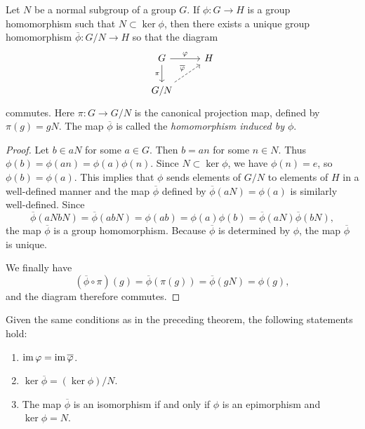 \begin{theorem}
    \label{thm:induced-homomorphism}
    Let \(N\) be a normal subgroup of a group \(G\). If \(\phi: G \to H\) is a
    group homomorphism such that \(N \subset \ker \phi\), then there exists a
    unique group homomorphism \(\overline{\phi}: G/N \to H\) so that the diagram
    \[
        \begin{tikzcd}
            G \arrow{r}{\phi} \arrow[swap]{d}{\pi} & H \\
            G/N \arrow[dashed]{ur}{\overline{\phi}}
        \end{tikzcd}
    \]
    commutes. Here \(\pi: G \to G/N\) is the canonical projection map, defined
    by \(\pi(g) = gN\). The map \(\overline{\phi}\) is called the
    \emph{homomorphism induced by \(\phi\)}.
\end{theorem}

\begin{proof}
    Let \(b \in aN\) for some \(a \in G\). Then \(b = an\) for some \(n \in N\).
    Thus \(\phi(b) = \phi(an) = \phi(a)\phi(n)\). Since \(N \subset \ker \phi\),
    we have \(\phi(n) = e\), so \(\phi(b) = \phi(a)\). This implies that
    \(\phi\) sends elements of \(G/N\) to elements of \(H\) in a well-defined
    manner and the map \(\overline{\phi}\) defined by \(\overline{\phi}(aN) =
    \phi(a)\) is similarly well-defined. Since
    \[
    \overline{\phi}(aNbN) = \overline{\phi}(abN) = \phi(ab) = \phi(a)\phi(b) = \overline{\phi}(aN)\overline{\phi}(bN),
    \]
    the map \(\overline{\phi}\) is a group homomorphism. Because
    \(\overline{\phi}\) is determined by \(\phi\), the map \(\overline{\phi}\)
    is unique.

    We finally have
    \[
        (\overline{\phi} \circ \pi)(g) = \overline{\phi}(\pi(g)) = \overline{\phi}(gN) = \phi(g),
    \]
    and the diagram therefore commutes.
\end{proof}

\begin{theorem}
    \label{thm:induced-homomorphism-props}
    Given the same conditions as in the preceding theorem, the following
    statements hold:
    \begin{enumerate}[label=(\alph*)]
        \item \(\operatorname{im} \varphi = \operatorname{im} \overline{\varphi}\).
        \item \(\ker \overline{\phi} = (\ker \phi)/N\).
        \item The map \(\overline{\phi}\) is an isomorphism if and only if
        \(\phi\) is an epimorphism and \(\ker \phi = N\).
    \end{enumerate}
\end{theorem}

